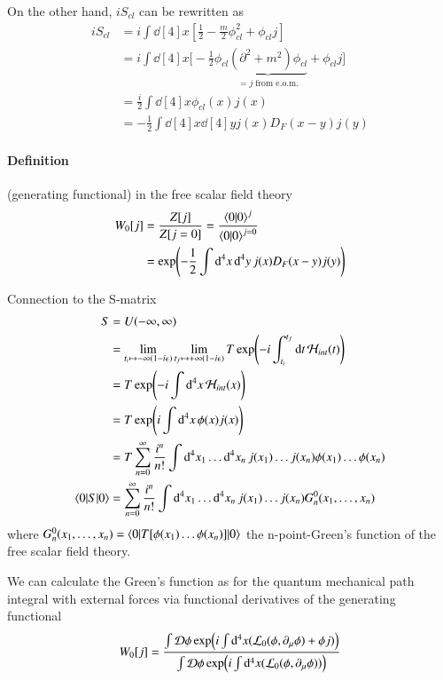 On the other hand, $iS_{cl}$ can be rewritten as
\begin{align*}
   iS_{cl} &= i \int \dd[4]{x} \left[ \frac{1}{2} - \frac{m}{2} \phi_{cl}^2 + \phi_{cl} j \right] \\
           &= i \int \dd[4]{x} \bigg[ -\frac{1}{2} \phi_{cl} \underbrace{\left( \partial^2 + m^2 \right)\phi_{cl}}_{=j \;\text{from e.o.m.}} + \phi_{cl} j \bigg] \\
           &= \frac{i}{2} \int \dd[4]{x} \phi_{cl}(x) j(x) \\
           &= -\frac{1}{2} \int \dd[4]{x} \dd[4]{y} j(x) D_F(x-y) j(y)
\end{align*}

\paragraph{Definition} (generating functional) in the free scalar field theory
\begin{align}
   W_0[j] &= \frac{Z[j]}{Z[j=0]} = \frac{\braket{0 | 0}^j}{\braket{0 | 0}^{j=0}} \notag\\
            &= \exp(-\frac{1}{2} \int \dd[4]{x}\dd[4]{y} j(x) D_F(x-y) j(y))
\end{align}

Connection to the S-matrix
\begin{align}
   S &= U(-\infty, \infty) \notag\\
     &= \lim_{t_i \mapsto -\infty(1-i\epsilon)}\lim_{t_f \mapsto +\infty(1-i\epsilon)} T \exp(-i\int^{t_f}_{t_i} \dd{t} \mathcal{H}_{int} (t)) \notag\\
   &= T \exp(-i\int \dd[4]{x}\mathcal{H}_{int} (x)) \notag\\
   &= T \exp(i\int \dd[4]{x} \phi(x) j(x)) \notag\\
   &= T \sum_{n=0}^{\infty} \frac{i^n}{n!} \int \dd[4]{x_1} \dots \dd[4]{x_n} j(x_1) \dots j(x_n) \phi(x_1) \dots \phi(x_n) \notag\\
   \braket{0 | S | 0} &= \sum_{n=0}^{\infty} \frac{i^n}{n!} \int \dd[4]{x_1} \dots \dd[4]{x_n}  j(x_1) \dots j(x_n)G_n^0 (x_1, \dots, x_n)
\end{align}
where $G^0_n(x_1, \dots, x_n) = \braket{0 | T [\phi(x_1) \dots \phi(x_n)]| 0}$ the n-point-Green's function of the free scalar field theory.

We can calculate the Green's function as for the quantum mechanical path integral with external forces via functional derivatives of the generating functional
\begin{align}
   W_0[j] = \frac{\int \mathcal{D} \phi \exp(i\int \dd^4 x (\mathcal{L}_0(\phi, \partial_\mu \phi)+\phi j))}{\int \mathcal{D} \phi \exp(i\int \dd^4 x (\mathcal{L}_0(\phi, \partial_\mu \phi)))}
\end{align}

